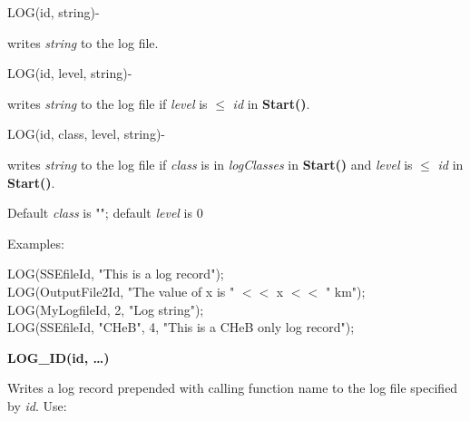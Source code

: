 \hfill
\begin{minipage}{\dimexpr\textwidth-2em}

        \medskip
        \begin{minipage}[t][][b]{12.5em}LOG(id, string)\hfill{-}\end{minipage}
        \begin{minipage}[t][][b]{\dimexpr\textwidth-12.7em}
            writes \textit{string} to the log file.
        \end{minipage}\vfill

        \medskip
        \begin{minipage}[t][][b]{12.5em}LOG(id, level, string)\hfill{-}\end{minipage}
        \begin{minipage}[t][][b]{\dimexpr\textwidth-12.7em}
            writes \textit{string} to the log file if \textit{level} is $\leq$ \textit{id} in \textbf{Start()}.
        \end{minipage}\vfill

        \medskip
        \begin{minipage}[t][][b]{12.5em}LOG(id, class, level, string)\hfill{-}\end{minipage}
        \begin{minipage}[t][][b]{\dimexpr\textwidth-12.7em}
            writes \textit{string} to the log file if \textit{class} is in \textit{logClasses} in \textbf{Start()} and \textit{level} is $\leq$ \textit{id} in \textbf{Start()}.
        \end{minipage}\vfill

    \medskip
    Default \textit{class} is ""; default \textit{level} is 0

    \medskip
    Examples:

    \medskip
    \tabto{3em}LOG(SSEfileId, "This is a log record"); \\
    \tabto{3em}LOG(OutputFile2Id, "The value of x is " $<<$ x $<<$ " km"); \\
    \tabto{3em}LOG(MyLogfileId, 2, "Log string"); \\
    \tabto{3em}LOG(SSEfileId, "CHeB", 4, "This is a CHeB only log record");
\end{minipage}


\bigskip
\textbf{LOG\_ID(id, {\dots})}

Writes a log record prepended with calling function name to the log file specified by \textit{id}.  Use:

